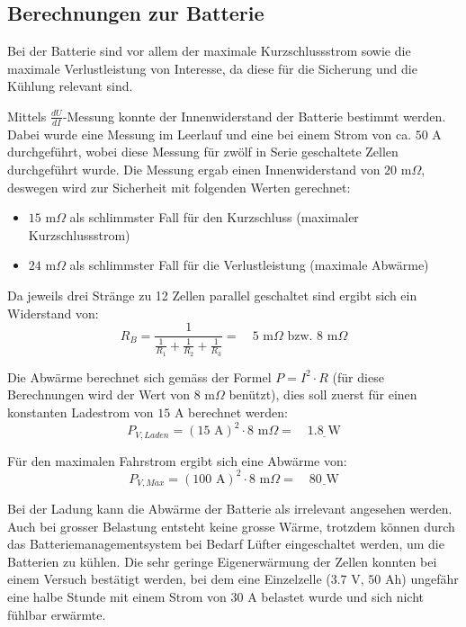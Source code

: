 \subsection{Berechnungen zur Batterie}

Bei der Batterie sind vor allem der maximale Kurzschlussstrom sowie die maximale Verlustleistung von Interesse, da diese für die Sicherung und die Kühlung relevant sind.

Mittels $\frac{dU}{dI}$-Messung konnte der Innenwiderstand der Batterie bestimmt werden. Dabei wurde eine Messung im Leerlauf und eine bei einem Strom von ca. $50$ A durchgeführt, wobei diese Messung für zwölf in Serie geschaltete Zellen durchgeführt wurde. Die Messung ergab einen Innenwiderstand von $20$ m$\Omega$, deswegen wird zur Sicherheit mit folgenden Werten gerechnet:
\begin{itemize}
	\item $15$ m$\Omega$ als schlimmster Fall für den Kurzschluss (maximaler Kurzschlussstrom)
	\item $24$ m$\Omega$ als schlimmster Fall für die Verlustleistung (maximale Abwärme)
\end{itemize}

Da jeweils drei Stränge zu 12 Zellen parallel geschaltet sind ergibt sich ein Widerstand von:
\begin{equation*}
	R_B=\frac{1}{\frac{1}{R_1}+\frac{1}{R_2}+\frac{1}{R_3}}=\quad 5\text{ m}\Omega\text{ bzw. } 8\text{ m}\Omega
\end{equation*}

Die Abwärme berechnet sich gemäss der Formel $P=I^2\cdot R$ (für diese Berechnungen wird der Wert von $8$ m$\Omega$ benützt), dies soll zuerst für einen konstanten Ladestrom von $15$ A berechnet werden:
\begin{equation*}
	P_{V,Laden}=\left(15\text{ A}\right)^2\cdot8\text{ m}\Omega=\quad\underline{1.8\text{ W}}
\end{equation*}

Für den maximalen Fahrstrom ergibt sich eine Abwärme von:
\begin{equation*}
	P_{V,Max}=\left(100\text{ A}\right)^2\cdot8\text{ m}\Omega=\quad\underline{80\text{ W}}
\end{equation*}

Bei der Ladung kann die Abwärme der Batterie als irrelevant angesehen werden. Auch bei grosser Belastung entsteht keine grosse Wärme, trotzdem können durch das Batteriemanagementsystem bei Bedarf Lüfter eingeschaltet werden, um die Batterien zu kühlen. Die sehr geringe Eigenerwärmung der Zellen konnten bei einem Versuch bestätigt werden, bei dem eine Einzelzelle ($3.7$ V, $50$ Ah) ungefähr eine halbe Stunde mit einem Strom von $30$ A belastet wurde und sich nicht fühlbar erwärmte.

